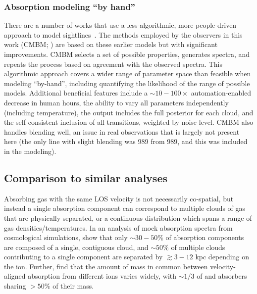\documentclass[fleqn,usenatbib]{mnras}
\begin{document}
\subsubsection{Absorption modeling ``by hand''}

There are a number of works that use a less-algorithmic, more people-driven approach to model sightlines~\citep[e.g.][]{churchill1999Multiple, charlton2000anticipating, charlton2003high, ding2003quadruple, ding2003multiphase, ding2005absorption, zonak2004absorption, masiero2005models, lynch2007physical, misawa2008supersolar, lacki2010z, jones2010Bare, muzahid2015Extreme, richter2018New, rosenwasser2018understanding, norris2021Discovery}.
The methods employed by the observers in this work (CMBM; \citealt{sameer2021Cloudbycloud, sameer2022Probing}) are based on these earlier models but with significant improvements.
CMBM selects a set of possible properties, generates spectra, and repeats the process based on agreement with the observed spectra.
This algorithmic approach covers a wider range of parameter space than feasible when modeling ``by-hand'', including quantifying the likelihood of the range of possible models.
Additional beneficial features include
a $\sim 10-100 \times$ automation-enabled decrease in human hours,
the ability to vary all parameters independently (including temperature),
the output includes the full posterior for each cloud,
and the self-consistent inclusion of all transitions, weighted by noise level.
CMBM also handles blending well, an issue in real observations that is largely not present here
(the only line with slight blending was  989 from  989, and this was included in the modeling).

\subsection{Comparison to similar analyses}

Absorbing gas with the same LOS velocity is not necessarily co-spatial, but instead a single absorption component can correspond to multiple clouds of gas that are physically separated, or a continuous distribution which spans a range of gas densities/temperatures. 
In an analysis of mock absorption spectra from cosmological simulations, \cite{marra2022Examining} show that only $\sim 30-50\%$ of absorption components are composed of a single, contiguous cloud, and $\sim 50\%$ of multiple clouds contributing to a single component are separated by $\gtrsim 3-12$ kpc depending on the ion.
Further, \cite{marra2022Examining} find that the amount of mass in common between velocity-aligned absorption from different ions varies widely, with $\sim 1/3$ of  and  absorbers sharing $>50\%$ of their mass.
\end{document}
